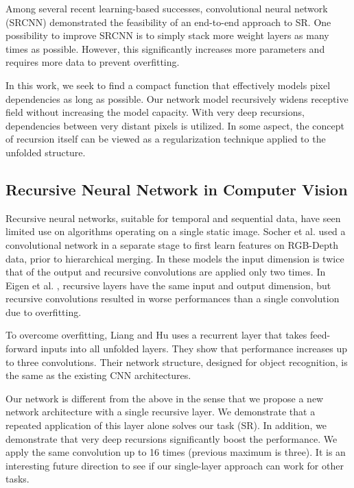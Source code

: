 \documentclass[10pt,twocolumn,letterpaper]{article}
\begin{document}
Among several recent learning-based successes,  convolutional neural network (SRCNN) \cite{dong2014image} demonstrated the feasibility of an end-to-end approach to SR. One possibility to improve SRCNN is to simply stack more weight layers as many times as possible. However, this significantly increases more parameters and requires more data to prevent overfitting.  

In this work, we seek to find a compact function that effectively models pixel dependencies as long as possible. Our network model recursively widens receptive field without increasing the model capacity. With very deep recursions, dependencies between very distant pixels is utilized. In some aspect, the concept of recursion itself can be viewed as a regularization technique applied to the unfolded structure. 

\subsection{Recursive Neural Network in Computer Vision}

Recursive neural networks, suitable for temporal and sequential data, have seen limited use on algorithms operating on a single static image.   Socher et al.  \cite{socher2012convolutional} used a convolutional network in a separate stage to first learn features on RGB-Depth data, prior to hierarchical merging. In these models the input dimension is twice that of the output and recursive convolutions are applied only two times. In Eigen et al. \cite{Eigen2014}, recursive layers have the same input and output dimension, but recursive convolutions resulted in worse performances than a single convolution due to overfitting. 

To overcome overfitting, Liang and Hu \cite{Liang_2015_CVPR} uses a recurrent layer that takes feed-forward inputs into all unfolded layers. They show that performance increases up to three convolutions. Their network structure, designed for object recognition, is the same as the existing CNN architectures.

Our network is different from the above in the sense that we propose a new network architecture with a single recursive layer. We demonstrate that a repeated application of this layer alone solves our task (SR). In addition, we demonstrate that very deep recursions significantly boost the performance. We apply the same convolution up to 16 times (previous maximum is three). It is an interesting future direction to see if our single-layer approach can work for other tasks.  
\end{document}
